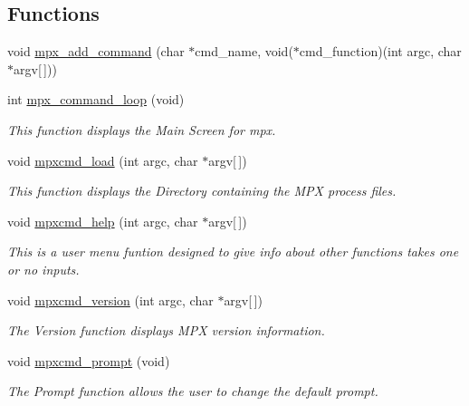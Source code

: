 \subsection*{Functions}
\begin{DoxyCompactItemize}
\item 
void \hyperlink{_m_p_x___c_m_d_8_c_a52c02eb85fda9ac4278e10088a192e89}{mpx\_\-add\_\-command} (char $\ast$cmd\_\-name, void($\ast$cmd\_\-function)(int argc, char $\ast$argv\mbox{[}$\,$\mbox{]}))
\item 
int \hyperlink{_m_p_x___c_m_d_8_c_ab2f64c5ce0432edca230a87739501703}{mpx\_\-command\_\-loop} (void)
\begin{DoxyCompactList}\small\item\em This function displays the Main Screen for mpx. \item\end{DoxyCompactList}\item 
void \hyperlink{_m_p_x___c_m_d_8_c_ab121952706478a3ce5951ab91298d391}{mpxcmd\_\-load} (int argc, char $\ast$argv\mbox{[}$\,$\mbox{]})
\begin{DoxyCompactList}\small\item\em This function displays the Directory containing the MPX process files. \item\end{DoxyCompactList}\item 
void \hyperlink{_m_p_x___c_m_d_8_c_ae9b1349cfcfc34815e87cae5330660e8}{mpxcmd\_\-help} (int argc, char $\ast$argv\mbox{[}$\,$\mbox{]})
\begin{DoxyCompactList}\small\item\em This is a user menu funtion designed to give info about other functions takes one or no inputs. \item\end{DoxyCompactList}\item 
void \hyperlink{_m_p_x___c_m_d_8_c_a70a1ce3926ea7c41321ab42b4161df0d}{mpxcmd\_\-version} (int argc, char $\ast$argv\mbox{[}$\,$\mbox{]})
\begin{DoxyCompactList}\small\item\em The Version function displays MPX version information. \item\end{DoxyCompactList}\item 
void \hyperlink{_m_p_x___c_m_d_8_c_a0a04805761cf7c183609e1383a4c4975}{mpxcmd\_\-prompt} (void)
\begin{DoxyCompactList}\small\item\em The Prompt function allows the user to change the default prompt. \item\end{DoxyCompactList}\item 

\end{DoxyCompactItemize}
